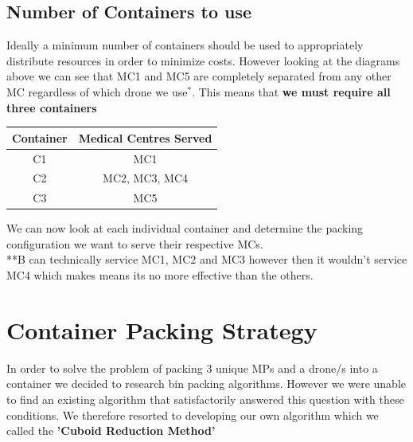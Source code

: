 \documentclass[a4paper,12pt]{article}
\begin{document}
\newpage

\subsection{Number of Containers to use}
Ideally a minimum number of containers should be used to appropriately distribute resources in order to minimize costs.
However looking at the diagrams above we can see that MC1 and MC5 are completely separated from any other MC regardless
of which drone we use$^{*}$. This means that \bf{we must require all three containers} 

\begin{center}
\begin{tabular}{ |c|c| }
 \hline
 Container & Medical Centres Served \\\hline
  C1 & MC1 \\
  C2 & MC2, MC3, MC4  \\
  C3 & MC5 \\
 \hline
\end{tabular}
\end{center}

We can now look at each individual container and determine the packing configuration we want to serve their respective MCs.
\\**B can technically service MC1, MC2 and MC3 however then it wouldn't service MC4 which makes means its no more effective than the others.
\section{Container Packing Strategy}
In order to solve the problem of packing 3 unique MPs and a drone/s into a container we decided to research bin packing algorithms.
However we were unable to find an existing algorithm that satisfactorily answered this question with these conditions.
We therefore resorted to developing our own algorithm which we called the \bf{'Cuboid Reduction Method'} 
\end{document}
